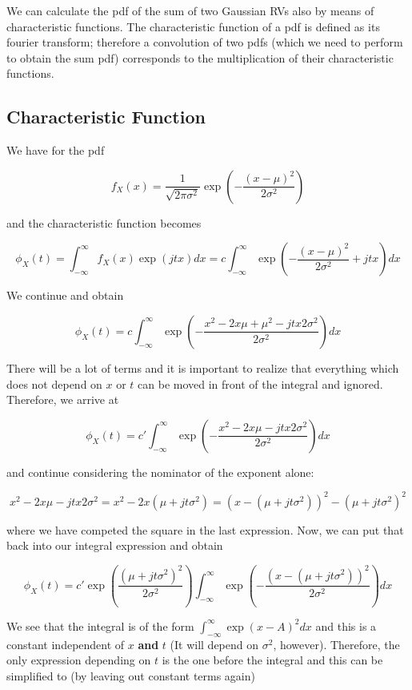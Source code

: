 

We can calculate the pdf of the sum of two Gaussian RVs also by means of
characteristic functions. The characteristic function of a pdf is
defined as its fourier transform; therefore a convolution of two pdfs
(which we need to perform to obtain the sum pdf) corresponds to the
multiplication of their characteristic functions.

\subsection{Characteristic Function}

We have for the pdf

\[
f_X(x) = \frac{1}{\sqrt{2\pi \sigma^2}} \exp \left( - \frac{(x-\mu)^2}{2\sigma^2} \right)
\]

and the characteristic function becomes

\[
\phi_X(t) = \int_{- \infty}^\infty f_X(x) \exp (jtx) dx = c \int_{- \infty}^\infty \exp \left( - \frac{(x-\mu)^2}{2\sigma^2} + jtx \right) dx
\]

We continue and obtain

\[
\phi_X(t) = c \int_{- \infty}^\infty \exp \left(- \frac{ x^2 - 2x\mu + \mu^2 - jtx2\sigma^2 }{2\sigma^2} \right) dx
\]

There will be a lot of terms and it is important to realize that
everything which does not depend on \(x\) or \(t\) can be moved in front
of the integral and ignored. Therefore, we arrive at

\[
\phi_X(t) = c' \int_{- \infty}^\infty \exp \left( - \frac{ x^2 - 2x\mu - jtx2\sigma^2 }{2\sigma^2} \right) dx
\]

and continue considering the nominator of the exponent alone:

\[
x^2 - 2x\mu - jtx2\sigma^2 = x^2 - 2x(\mu + jt\sigma^2) = \left( x-(\mu + jt\sigma^2) \right)^2 - (\mu + jt\sigma^2)^2
\]

where we have competed the square in the last expression. Now, we can
put that back into our integral expression and obtain

\[
\phi_X(t) = c' \exp \left(\frac{ (\mu + jt\sigma^2)^2 }{2\sigma^2} \right)  \int_{- \infty}^\infty \exp \left(- \frac{ \left( x-(\mu + jt\sigma^2) \right)^2 }{2\sigma^2} \right) dx
\]

We see that the integral is of the form
\(\int_{- \infty}^\infty \exp (x-A)^2dx\) and this is a constant
independent of \(x\) \textbf{and} \(t\) (It will depend on \(\sigma^2\),
however). Therefore, the only expression depending on \(t\) is the one
before the integral and this can be simplified to (by leaving out
constant terms again)

